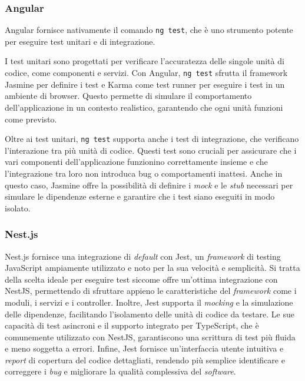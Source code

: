 \subsubsection{Angular}
Angular fornisce nativamente il comando \texttt{ng test}, che è uno strumento
potente per eseguire test unitari e di integrazione.

I test unitari sono progettati per verificare l'accuratezza delle singole
unità di codice, come componenti e servizi. Con Angular, \texttt{ng test}
sfrutta il framework Jasmine per definire i test e Karma come test runner per
eseguire i test in un ambiente di browser. Questo permette di simulare il
comportamento dell'applicazione in un contesto realistico, garantendo che ogni
unità funzioni come previsto.

Oltre ai test unitari, \texttt{ng test} supporta anche i test di integrazione,
che verificano l'interazione tra più unità di codice. Questi test sono cruciali
per assicurare che i vari componenti dell'applicazione funzionino
correttamente insieme e che l'integrazione tra loro non introduca bug o
comportamenti inattesi. Anche in questo caso, Jasmine offre la possibilità di
definire i \textit{mock} e le \textit{stub} necessari per simulare le dipendenze
esterne e garantire che i test siano eseguiti in modo isolato.


\subsubsection{Nest.js}
Nest.js fornisce una integrazione di \textit{default} con Jest, un \textit{framework} di testing JavaScript ampiamente utilizzato e noto per la sua velocità e semplicità. 
Si tratta della scelta ideale per eseguire test siccome offre un'ottima integrazione con NestJS, permettendo di sfruttare appieno le caratteristiche del \textit{framework} come i moduli, i servizi e i controller. 
Inoltre, Jest supporta il \textit{mocking} e la simulazione delle dipendenze, facilitando l'isolamento delle unità di codice da testare. 
Le sue capacità di test asincroni e il supporto integrato per TypeScript, che è comunemente utilizzato con NestJS, garantiscono una scrittura di test più fluida e meno soggetta a errori. 
Infine, Jest fornisce un'interfaccia utente intuitiva e \textit{report} di copertura del codice dettagliati, rendendo più semplice identificare e correggere i \textit{bug} e migliorare la qualità complessiva del \textit{software}.


